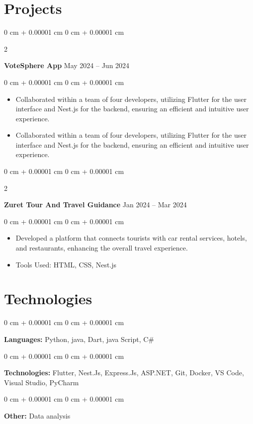 \documentclass[10pt, letterpaper]{article}
\newenvironment{highlights}{
    \begin{itemize}[
        topsep=0.10 cm,
        parsep=0.10 cm,
        partopsep=0pt,
        itemsep=0pt,
        leftmargin=0 cm + 10pt
    ]
}{
    \end{itemize}
} %
\newenvironment{onecolentry}{
    \begin{adjustwidth}{
        0 cm + 0.00001 cm
    }{
        0 cm + 0.00001 cm
    }
}{
    \end{adjustwidth}
} %
\newenvironment{twocolentry}[2][]{
    \onecolentry
    \def\secondColumn{#2}
    \setcolumnwidth{\fill, 4.5 cm}
    \begin{paracol}{2}
}{
    \switchcolumn \raggedleft \secondColumn
    \end{paracol}
    \endonecolentry
} %
\begin{document}
    \section{Projects}

        \begin{twocolentry}{
            May 2024 – Jun 2024
        }
            \textbf{VoteSphere App}\end{twocolentry}

        \vspace{0.10 cm}
        \begin{onecolentry}
            \begin{highlights}
                \item Collaborated within a team of four developers, utilizing Flutter for the user interface and Nest.js for the backend, ensuring an efficient and intuitive user experience.
                \item Collaborated within a team of four developers, utilizing Flutter for the user interface and Nest.js for the backend, ensuring an efficient and intuitive user experience.
            \end{highlights}
        \end{onecolentry}

        \vspace{0.2 cm}

        \begin{twocolentry}{
            Jan 2024 – Mar 2024
        }
            \textbf{Zuret Tour And Travel Guidance}\end{twocolentry}

        \vspace{0.10 cm}
        \begin{onecolentry}
            \begin{highlights}
                \item Developed a platform that connects tourists with car rental services, hotels, and restaurants, enhancing the overall travel experience.
                \item Tools Used: HTML, CSS, Nest.js
            \end{highlights}
        \end{onecolentry}

    \section{Technologies} %
        \begin{onecolentry}
            \textbf{Languages:} Python, java, Dart, java Script, C\#
        \end{onecolentry}
        \vspace{0.2 cm}
        \begin{onecolentry}
            \textbf{Technologies:} Flutter, Nest.Js, Express.Js, ASP.NET, Git, Docker, VS Code, Visual Studio, PyCharm
        \end{onecolentry}
        \vspace{0.2 cm}
        \begin{onecolentry}
            \textbf{Other:} Data analysis
        \end{onecolentry}
\end{document}
